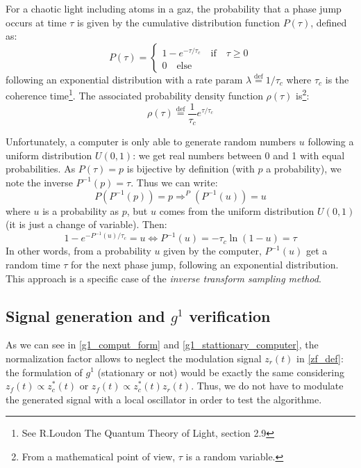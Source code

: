 \documentclass[12pt]{report}
\begin{document}
For a chaotic light including atoms in a gaz, the probability that a phase jump occurs at time $\tau$ is given by the cumulative distribution function $P(\tau)$, defined as:
\begin{equation}
P(\tau) = \left\{
                \begin{array}{ll}
                1-e^{-\tau/\tau_c} \quad \textrm{if} \quad \tau \geqslant 0\\
                0 \quad \textrm{else}
                \end{array}
              \right.
\end{equation}
following an exponential distribution with a rate param $\lambda \stackrel{\text{def}}{=} 1 / \tau_c$ where $\tau_c$ is the coherence time\footnote{ See R.Loudon The Quantum Theory of Light, section 2.9}. The associated probability density function $\rho(\tau)$ is\footnote{From a mathematical point of view, $\tau$ is a random variable.}:
\begin{equation}
\rho(\tau) \stackrel{\text{def}}{=} \frac{1}{\tau_c} e^{\tau / \tau_c}
\end{equation}

Unfortunately, a computer is only able to generate random numbers $u$ following a uniform distribution $U(0,1)$: we get real numbers between 0 and 1 with equal probabilities. As $P(\tau) = p$ is bijective by definition (with $p$ a probability), we note the inverse $P^{-1}(p) = \tau$. Thus we can write:
\begin{equation}
P(P^{-1}(p)) = p \Rightarrow ^P(P^{-1}(u)) = u
\end{equation}
where $u$ is a probability as $p$, but $u$ comes from the uniform distribution $U(0,1)$ (it is just a change of variable). Then:
\begin{equation}
\label{dist_exp_gene}
1-e^{-P^{-1}(u)/\tau_c} = u \Leftrightarrow P^{-1}(u) = -\tau_c \ln(1-u) = \tau
\end{equation}
In other words, from a probability $u$ given by the computer, $P^{-1}(u)$ get a random time $\tau$ for the next phase jump, following an exponential distribution. This approach is a specific case of the \textit{inverse transform sampling method}.

\subsection{Signal generation and $g^1$ verification}

As we can see in \eqref{g1_comput_form} and \eqref{g1_stattionary_computer}, the normalization factor allows to neglect the modulation signal $z_r(t)$ in \eqref{zf_def}: the formulation of $g^1$ (stationary or not) would be exactly the same considering $z_f(t) \propto z_c^*(t)$ or $z_f(t) \propto z_c^*(t)z_r(t)$. Thus, we do not have to modulate the generated signal with a local oscillator in order to test the algorithme.
\end{document}
